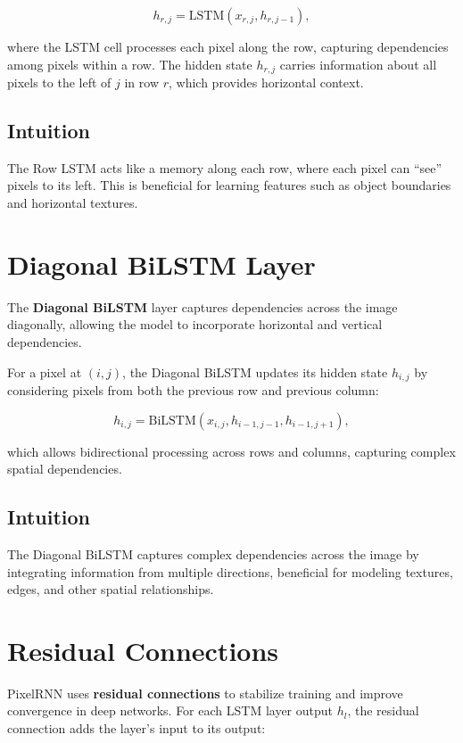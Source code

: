 \documentclass{article}
\begin{document}
\begin{equation}
    h_{r,j} = \text{LSTM}(x_{r,j}, h_{r,j-1}),
\end{equation}

where the LSTM cell processes each pixel along the row, capturing dependencies among pixels within a row. The hidden state \( h_{r,j} \) carries information about all pixels to the left of \( j \) in row \( r \), which provides horizontal context.

\subsection{Intuition}
The Row LSTM acts like a memory along each row, where each pixel can ``see'' pixels to its left. This is beneficial for learning features such as object boundaries and horizontal textures.

\section{Diagonal BiLSTM Layer}
The \textbf{Diagonal BiLSTM} layer captures dependencies across the image diagonally, allowing the model to incorporate horizontal and vertical dependencies.

For a pixel at \( (i, j) \), the Diagonal BiLSTM updates its hidden state \( h_{i,j} \) by considering pixels from both the previous row and previous column:

\begin{equation}
    h_{i,j} = \text{BiLSTM}(x_{i,j}, h_{i-1,j-1}, h_{i-1,j+1}),
\end{equation}

which allows bidirectional processing across rows and columns, capturing complex spatial dependencies.

\subsection{Intuition}
The Diagonal BiLSTM captures complex dependencies across the image by integrating information from multiple directions, beneficial for modeling textures, edges, and other spatial relationships.

\section{Residual Connections}
PixelRNN uses \textbf{residual connections} to stabilize training and improve convergence in deep networks. For each LSTM layer output \( h_{l} \), the residual connection adds the layer's input to its output:
\end{document}
